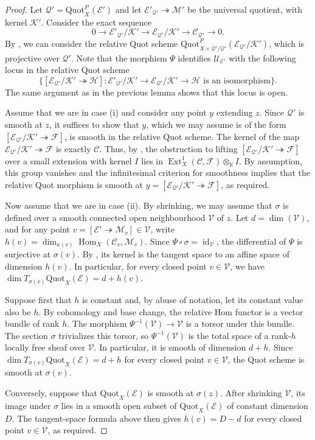\documentclass[leqno,11pt,a4paper]{amsart}
\theoremstyle{definition}
\numberwithin{equation}{section}
\newcommand{\kk}{\mathbb{K}}
\newcommand{\Quot}{\mathrm{Quot}}
\newcommand{\EE}{\mathscr{E}}
\newcommand{\CC}{\mathscr{C}}
\newcommand{\FF}{\mathscr{F}}
\newcommand{\MM}{\mathscr{M}}
\newcommand{\KK}{\mathscr{K}}
\newcommand{\QQ}{\mathcal{Q}}
\newcommand{\VV}{\mathcal{V}}
\DeclareMathOperator{\Hom}{Hom}
\DeclareMathOperator{\Ext}{Ext}
\begin{document}
\begin{proof}
Let $\QQ'=\Quot_X^P(\EE')$ and let $\EE'_{\QQ'}\twoheadrightarrow  \MM'$ be the universal quotient, with kernel $\KK'$.  
Consider the exact sequence
$$
0\longrightarrow  \EE'_{\QQ'}/\KK' \longrightarrow \EE_{\QQ'}/\KK' \longrightarrow  \CC_{\QQ'} \longrightarrow 0.
$$
By \cite[Theorem 2.2.4]{HL}, we can consider the relative Quot scheme $\Quot_{X\times \QQ'/\QQ'}^P(\EE_{\QQ'}/\KK')$, which is projective over $\QQ'$. 
Note that the morphism $\Psi$ identifies $\mathcal U_{\EE'}$ with the following locus in the relative Quot scheme
$$
\{[\EE_{\QQ'}/\KK' \twoheadrightarrow \mathscr{H}]: \EE'_{\QQ'}/\KK' \to \EE_{\QQ'}/\KK' \to  \mathscr{H} \text{ is an isomorphism} \}.
$$
The same argument as in the previous lemma shows that this locus is open.

Assume that we are in case (i) and consider any point $y$ extending $z$. 
Since $\QQ'$ is smooth at $z$, it suffices to show that $y$, which we may assume is of the form $[\EE_{\QQ'}/\KK' \twoheadrightarrow \FF]$, is smooth in the relative Quot scheme.
The kernel of the map $\EE_{\QQ'}/\KK' \twoheadrightarrow \FF$ is exactly $\CC$.
Thus, by \cite[Lemma 2.2.6]{HL}, the obstruction to lifting $[\EE_{\QQ'}/\KK' \twoheadrightarrow \FF]$ over a small extension with kernel $I$ lies in $\Ext_X^1(\mathscr C,\FF)\otimes_{\kk} I$.
By assumption, this group vanishes and the infinitesimal criterion for smoothness implies that the relative Quot morphism is smooth at $y=[\EE_{\QQ'}/\KK'\twoheadrightarrow\FF]$, as required.

Now assume that we are in case (ii). 
By shrinking, we may assume that $\sigma$ is defined over a smooth connected open neighbourhood $\VV$ of $z$. 
Let $d = \dim(\VV)$, and for any point $v=[\EE'\twoheadrightarrow\MM_v] \in \VV$, write $h(v)=\dim_{\kappa(v)}\Hom_X(\CC_v,\MM_v)$.
Since $\Psi\circ\sigma=\operatorname{id}_\VV$, the differential of $\Psi$ is surjective at $\sigma(v)$. 
By , its kernel is the tangent space to an affine space of dimension $h(v)$.
In particular, for every closed point $v\in \VV$, we have  $\dim T_{\sigma(v)}\Quot_X(\EE)=d+h(v)$.

Suppose first that $h$ is constant and, by abuse of notation, let its constant value also be $h$.
By cohomology and base change, the relative Hom functor is a vector bundle of rank $h$.
The morphism $\Psi^{-1}(\VV)\to\VV$ is a torsor under this bundle. 
The section $\sigma$ trivializes this torsor, so $\Psi^{-1}(\VV)$ is the total space of a rank-$h$ locally free sheaf over $\VV$. In particular, it is smooth of dimension $d+h$. 
Since $\dim T_{\sigma(v)}\Quot_X(\EE)=d+h$ for every closed point $v\in\VV$, the Quot scheme is smooth at $\sigma(v)$.

Conversely, suppose that $\Quot_X(\EE)$ is smooth at $\sigma(z)$.
After shrinking $\VV$, its image under $\sigma$ lies in a smooth open subset of $\Quot_X(\EE)$ of constant dimension $D$.
The tangent-space formula above then gives $h(v)=D-d$ for every closed point $v\in \VV$, as required. 
\end{proof}
\end{document}
